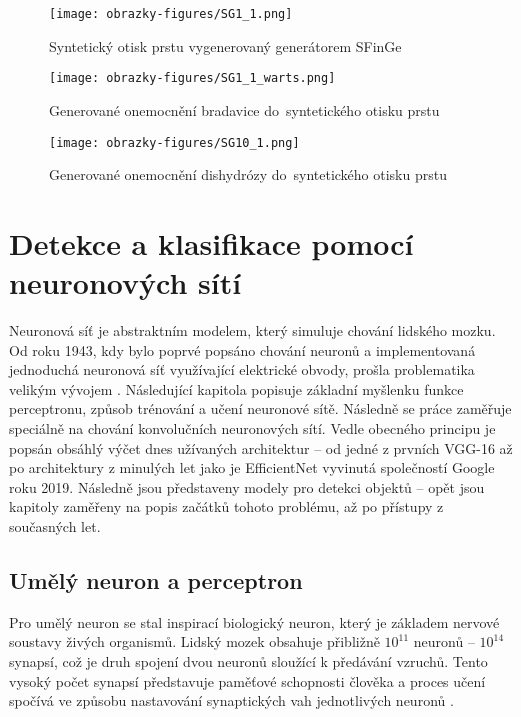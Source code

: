 \begin{figure}[!htbp]
  \begin{minipage}[b]{0.3\linewidth}
    \centering
    \texttt{[image: obrazky-figures/SG1\_1.png]}
    \caption{Syntetický otisk prstu vygenerovaný generátorem SFinGe}
  \end{minipage}
  \hspace{0.5cm}
  \begin{minipage}[b]{0.3\linewidth}
    \centering
    \texttt{[image: obrazky-figures/SG1\_1\_warts.png]}
    \caption{Generované onemocnění bradavice do~syntetického otisku prstu}
  \end{minipage}
  \hspace{0.5cm}
  \begin{minipage}[b]{0.3\linewidth}
    \centering
    \texttt{[image: obrazky-figures/SG10\_1.png]}
    \caption{Generované onemocnění dishydrózy do~syntetického otisku prstu}
  \end{minipage}
\end{figure}

\chapter{Detekce a klasifikace pomocí neuronových sítí}
Neuronová síť je abstraktním modelem, který simuluje chování lidského mozku. Od roku 1943, kdy bylo poprvé popsáno chování neuronů a implementovaná jednoduchá neuronová síť využívající elektrické obvody, prošla problematika velikým vývojem \cite{ANNHistory}. Následující kapitola popisuje základní myšlenku funkce perceptronu, způsob trénování a učení neuronové sítě. Následně se práce zaměřuje speciálně na chování konvolučních neuronových sítí. Vedle obecného principu je popsán obsáhlý výčet dnes užívaných architektur -- od jedné z prvních VGG-16 až po architektury z minulých let jako je EfficientNet vyvinutá společností Google roku 2019. Následně jsou představeny modely pro detekci objektů -- opět jsou kapitoly zaměřeny na popis začátků tohoto problému, až po přístupy z současných let.
\section{Umělý neuron a perceptron}
Pro umělý neuron se stal inspirací biologický neuron, který je základem nervové soustavy živých organismů. Lidský mozek obsahuje přibližně $10^{11}$ neuronů -- $10^{14}$ synapsí, což je druh spojení dvou neuronů sloužící k předávání vzruchů. Tento vysoký počet synapsí představuje paměťové schopnosti člověka a proces učení spočívá ve způsobu nastavování synaptických vah jednotlivých neuronů \cite{IZULecture}. 

